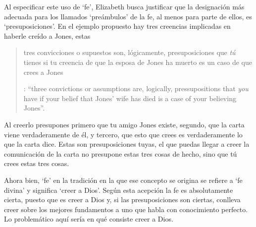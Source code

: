 Al especificar este uso de `fe', Elizabeth busca justificar que la designación más adecuada para los llamados `preámbulos' de la fe, al menos para parte de ellos, es `presuposiciones'. En el ejemplo propuesto hay tres creencias implicadas en haberle creído a Jones, estas \blockquote[{\Cite[114]{anscombe1981erp:faith}}: \enquote{three convictions or assumptions are, logically, pressupositions that \emph{you} have if your belief that Jones' wife has died is a case of your believing Jones}.]{tres convicciones o supuestos son, lógicamente, presuposiciones que \emph{tú} tienes si tu creencia de que la esposa de Jones ha muerto es un caso de que crees a Jones}.

Al creerlo presupones primero que tu amigo Jones existe, segundo, que la carta viene verdaderamente de él, y tercero, que esto que crees es verdaderamente lo que la carta dice. Estas son presuposiciones tuyas, el que puedas llegar a creer la comunicación de la carta no presupone estas tres cosas de hecho, sino que tú crees estas tres cosas.

Ahora bien, `fe' en la tradición en la que ese concepto se origina se refiere a `fe divina' y significa `creer a Dios'. Según esta acepción la fe es absolutamente cierta, puesto que es creer a Dios y, si las presuposiciones son ciertas, conlleva creer sobre los mejores fundamentos a uno que habla con conocimiento perfecto. Lo problemático aquí sería en qué consiste creer a Dios.

